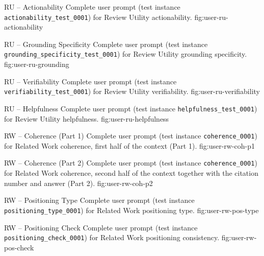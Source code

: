
\clearpage
\TaskUserPromptFigure
  {RU -- Actionability}
  {Complete user prompt (test instance \texttt{actionability\_test\_0001}) for Review Utility actionability.}
  {fig:user-ru-actionability}
  {\UserActionabilityReal}

\TaskUserPromptFigure
  {RU -- Grounding Specificity}
  {Complete user prompt (test instance \texttt{grounding\_specificity\_test\_0001}) for Review Utility grounding specificity.}
  {fig:user-ru-grounding}
  {\UserGroundingReal}

\clearpage
\TaskUserPromptFigure
  {RU -- Verifiability}
  {Complete user prompt (test instance \texttt{verifiability\_test\_0001}) for Review Utility verifiability.}
  {fig:user-ru-verifiability}
  {\UserVerifiabilityReal}

\TaskUserPromptFigure
  {RU -- Helpfulness}
  {Complete user prompt (test instance \texttt{helpfulness\_test\_0001}) for Review Utility helpfulness.}
  {fig:user-ru-helpfulness}
  {\UserHelpfulnessReal}

\clearpage
\TaskUserPromptFigure
  {RW -- Coherence (Part 1)}
  {Complete user prompt (test instance \texttt{coherence\_0001}) for Related Work coherence, first half of the context (Part 1).}
  {fig:user-rw-coh-p1}
  {\UserCoherenceRealPartOne}

\clearpage
\TaskUserPromptFigure
  {RW -- Coherence (Part 2)}
  {Complete user prompt (test instance \texttt{coherence\_0001}) for Related Work coherence, second half of the context together with the citation number and answer (Part 2).}
  {fig:user-rw-coh-p2}
  {\UserCoherenceRealPartTwo}

\clearpage
\TaskUserPromptFigure
  {RW -- Positioning Type}
  {Complete user prompt (test instance \texttt{positioning\_type\_0001}) for Related Work positioning type.}
  {fig:user-rw-pos-type}
  {\UserPositioningTypeReal}

\clearpage
\TaskUserPromptFigure
  {RW -- Positioning Check}
  {Complete user prompt (test instance \texttt{positioning\_check\_0001}) for Related Work positioning consistency.}
  {fig:user-rw-pos-check}
  {\UserPositioningCheckReal}


